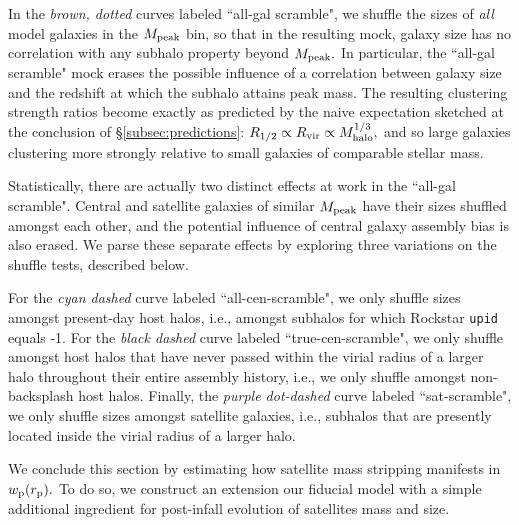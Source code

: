 \documentclass[usenatbib,usegraphicx,letterpaper]{mn2e}
\newcommand{\rhalf}{R_{1/2}}
\newcommand{\mpeak}{M_{\rm peak}}
\newcommand{\mhalo}{M_{\rm halo}}
\newcommand{\rvir}{R_{\rm vir}}
\newcommand{\rproj}{r_{\rm p}}
\newcommand{\wproj}{w_{\rm p}}
\begin{document}
In the {\em brown, dotted} curves labeled ``all-gal scramble", we shuffle the sizes of {\em all} model galaxies in the $\mpeak$ bin, so that in the resulting mock, galaxy size has no correlation with any subhalo property beyond $\mpeak.$ In particular, the ``all-gal scramble" mock erases the possible influence of a correlation between galaxy size and the redshift at which the subhalo attains peak mass. The resulting clustering strength ratios become exactly as predicted by the naive expectation sketched at the conclusion of \S\ref{subsec:predictions}: $\rhalf\propto\rvir\propto\mhalo^{1/3},$ and so large galaxies clustering more strongly relative to small galaxies of comparable stellar mass. 

Statistically, there are actually two distinct effects at work in the ``all-gal scramble".  Central and satellite galaxies of similar $\mpeak$ have their sizes shuffled amongst each other, and the potential influence of central galaxy assembly bias is also erased. We parse these separate effects by exploring three variations on the shuffle tests, described below. 

For the {\em cyan dashed} curve labeled ``all-cen-scramble", we only shuffle sizes amongst present-day host halos, i.e., amongst subhalos for which Rockstar {\tt upid} equals -1. For the {\em black dashed} curve labeled ``true-cen-scramble", we only shuffle amongst host halos that have never passed within the virial radius of a larger halo throughout their entire assembly history, i.e., we only shuffle amongst non-backsplash host halos. Finally, the {\em purple dot-dashed} curve labeled ``sat-scramble", we only shuffle sizes amongst satellite galaxies, i.e., subhalos that are presently located inside the virial radius of a larger halo. 




We conclude this section by estimating how satellite mass stripping manifests in $\wproj(\rproj).$ To do so, we construct an extension our fiducial model with a simple additional ingredient for post-infall evolution of satellites mass and size. 
\end{document}
